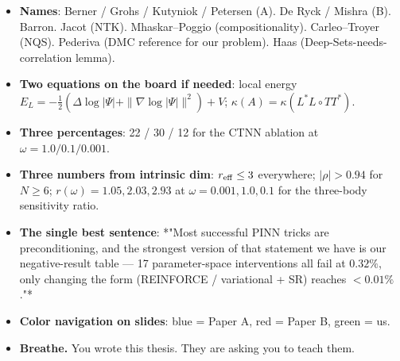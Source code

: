 \documentclass[11pt]{article}
\begin{document}
\begin{itemize}
\item \textbf{Names}: Berner / Grohs / Kutyniok / Petersen (A). De Ryck / Mishra
(B). Barron. Jacot (NTK). Mhaskar--Poggio (compositionality).
Carleo--Troyer (NQS). Pederiva (DMC reference for our problem).
Haas (Deep-Sets-needs-correlation lemma).
\item \textbf{Two equations on the board if needed}: local energy
$E_L = -\frac12(\Delta \log|\Psi| + \|\nabla \log|\Psi|\|^2) + V$;
$\kappa(A) = \kappa(L^* L \circ T T^*)$.
\item \textbf{Three percentages}: 22 / 30 / 12 for the CTNN ablation at $\omega
  = 1.0 / 0.1 / 0.001$.
\item \textbf{Three numbers from intrinsic dim}: $r_{\rm eff} \le 3$ everywhere;
$|\rho| > 0.94$ for $N \ge 6$; $r(\omega) = 1.05, 2.03, 2.93$ at
$\omega = 0.001, 1.0, 0.1$ for the three-body sensitivity ratio.
\item \textbf{The single best sentence}: *"Most successful PINN tricks are
preconditioning, and the strongest version of that statement we have
is our negative-result table --- 17 parameter-space interventions all
fail at $0.32\%$, only changing the form (REINFORCE / variational +
SR) reaches $< 0.01\%$."*
\item \textbf{Color navigation on slides}: blue = Paper A, red = Paper B, green
= us.
\item \textbf{Breathe.} You wrote this thesis. They are asking you to teach them.
\end{itemize}
\end{document}
